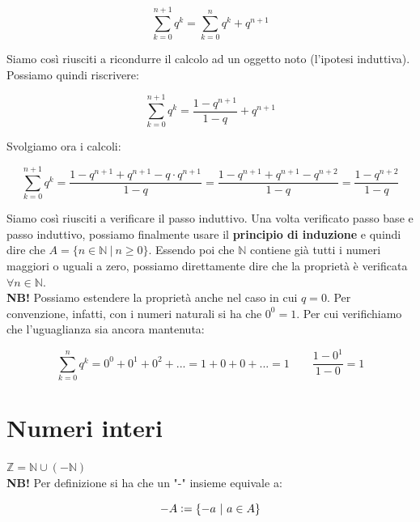 \documentclass{article}
\begin{document}
\begin{equation*}
    \sum_{k = 0}^{n + 1} q^k = \sum_{k = 0}^n q^k + q^{n + 1}
\end{equation*}

\noindent Siamo così riusciti a ricondurre il calcolo ad un oggetto noto (l'ipotesi induttiva). Possiamo quindi riscrivere: 

\begin{equation*}
    \sum_{k = 0}^{n + 1} q^k = \frac{1-q^{n+1}}{1-q} + q^{n + 1}
\end{equation*}

\noindent Svolgiamo ora i calcoli:

\begin{equation*}
    \sum_{k = 0}^{n + 1} q^k = \frac{1-q^{n+1} + q^{n+1} - q\cdot q^{n+1}}{1-q} = \frac{1-q^{n+1} + q^{n+1} - q^{n+2}}{1-q} = \frac{1 - q^{n+2}}{1-q}
\end{equation*}

\noindent Siamo così riusciti a verificare il passo induttivo. Una volta verificato passo base e passo induttivo, possiamo finalmente usare il \textbf{principio di induzione} e quindi dire che $A = \{ n \in \mathbb{N} \ | \ n \geq 0 \}$. Essendo poi che $\mathbb{N}$ contiene già tutti i numeri maggiori o uguali a zero, possiamo direttamente dire che la proprietà è verificata $\forall n \in \mathbb{N}$. \\

\noindent\textbf{NB!} Possiamo estendere la proprietà anche nel caso in cui $q = 0$. Per convenzione, infatti, con i numeri naturali si ha che $0^0 = 1$. Per cui verifichiamo che l'uguaglianza sia ancora mantenuta:

\begin{equation*}
    \sum_{k=0}^n q^k = 0^0 + 0^1 + 0^2 + ... = 1 + 0 + 0 + ... = 1 \qquad \frac{1 - 0^1}{1 - 0} = 1
\end{equation*}

\section{Numeri interi}
$\mathbb{Z} = \mathbb{N} \cup (- \mathbb{N})$ \\

\noindent\textbf{NB!} Per definizione si ha che un "-" insieme equivale a:

\begin{equation*}
    -A \vcentcolon = \{ -a \ | \ a \in A \}
\end{equation*}
\end{document}
